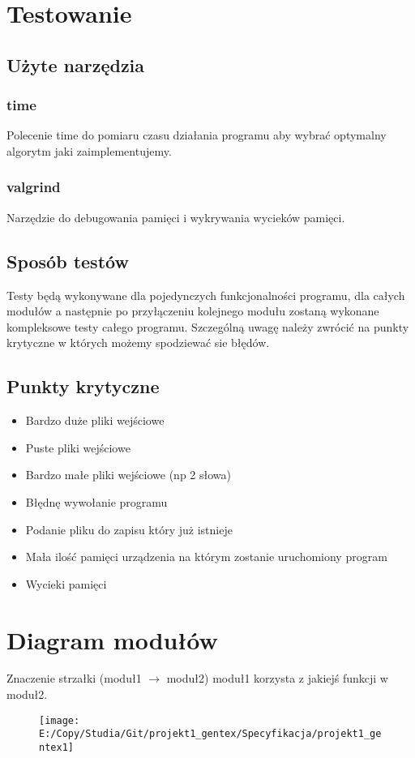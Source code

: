 \documentclass[12pt,a4paper]{report}
\begin{document}
\section*{Testowanie}

	\subsection*{Użyte narzędzia}
	
		\subsubsection*{time} Polecenie time do pomiaru czasu działania programu aby wybrać optymalny algorytm jaki zaimplementujemy.
		
		\subsubsection*{valgrind} Narzędzie do debugowania pamięci i wykrywania wycieków pamięci.

	\subsection*{Sposób testów} Testy będą wykonywane dla pojedynczych funkcjonalności programu, dla całych modułów a następnie po przyłączeniu kolejnego modułu zostaną wykonane kompleksowe testy całego programu. Szczególną uwagę należy zwrócić na punkty krytyczne w których możemy spodziewać sie błędów.

	\subsection*{Punkty krytyczne} 
		\begin{itemize}
			
			\item Bardzo duże pliki wejściowe
			\item Puste pliki wejściowe
			\item Bardzo małe pliki wejściowe (np 2 słowa)
			\item Błędnę wywołanie programu
			\item Podanie pliku do zapisu który już istnieje
			\item Mała ilość pamięci urządzenia na którym zostanie uruchomiony program
			\item Wycieki pamięci
			
		\end{itemize}

\section*{Diagram modułów} 

	Znaczenie strzałki (moduł1 $\longrightarrow$ moduł2) moduł1 korzysta z jakiejś funkcji w moduł2.
\begin{figure}
\centering
\texttt{[image: E:/Copy/Studia/Git/projekt1\_gentex/Specyfikacja/projekt1\_gentex1]}
\caption{}
\label{fig:projekt1_gentex1}
\end{figure}
\end{document}
